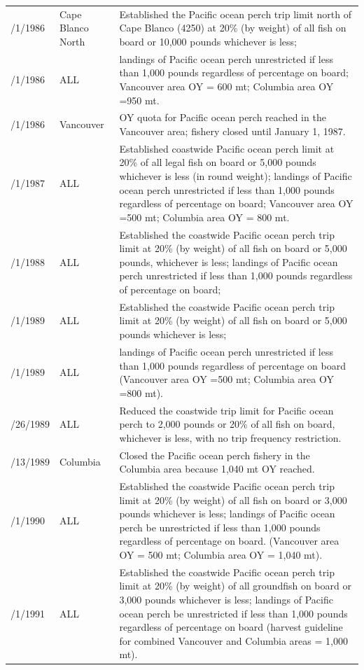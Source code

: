 \documentclass[12pt,]{article}
\begin{document}
\begin{table}[ht]
\begin{tabular}{>{\centering}p{.60in}>{\centering}p{1.0in}>{\raggedright}p{4.20in}}
  1/1/1986 &  Cape Blanco North  &  Established the Pacific ocean perch trip limit north of Cape Blanco (4250) at 20\% (by weight) of all fish on board or 10,000 pounds whichever is less;  \\ 
  1/1/1986 &  ALL  &  landings of Pacific ocean perch unrestricted if less than 1,000 pounds regardless of percentage on board; Vancouver area OY = 600 mt; Columbia area OY =950 mt.  \\ 
  12/1/1986 &  Vancouver  &  OY quota for Pacific ocean perch reached in the Vancouver area; fishery closed until January 1, 1987.  \\ 
  1/1/1987 &  ALL  &  Established coastwide Pacific ocean perch limit at 20\% of all legal fish on board or 5,000 pounds whichever is less (in round weight); landings of Pacific ocean perch unrestricted if less than 1,000 pounds regardless of percentage on board; Vancouver area OY =500 mt; Columbia area OY = 800 mt.  \\ 
  1/1/1988 &  ALL  &  Established the coastwide Pacific ocean perch trip limit at 20\% (by weight) of all fish on board or 5,000 pounds, whichever is less; landings of Pacific ocean perch unrestricted if less than 1,000 pounds regardless of percentage on board;  \\ 
  1/1/1989 &  ALL  &  Established the coastwide Pacific ocean perch trip limit at 20\% (by weight) of all fish on board or 5,000 pounds whichever is less;  \\ 
  1/1/1989 &  ALL  &  landings of Pacific ocean perch unrestricted if less than 1,000 pounds regardless of percentage on board (Vancouver area OY =500 mt; Columbia area OY =800 mt).  \\ 
  7/26/1989 &  ALL  &  Reduced the coastwide trip limit for Pacific ocean perch to 2,000 pounds or 20\% of all fish on board, whichever is less, with no trip frequency restriction.  \\ 
  12/13/1989 &  Columbia  &   Closed the Pacific ocean perch fishery in the Columbia area because 1,040 mt OY reached.  \\ 
  1/1/1990 &  ALL  &  Established the coastwide Pacific ocean perch trip limit at 20\% (by weight) of all fish on board or 3,000 pounds whichever is less; landings of Pacific ocean perch be unrestricted if less than 1,000 pounds regardless of percentage on board.  (Vancouver area OY = 500 mt; Columbia area OY = 1,040 mt). \\ 
  1/1/1991 &  ALL  &  Established the coastwide Pacific ocean perch trip limit at 20\% (by weight) of all groundfish on board or 3,000 pounds whichever is less; landings of Pacific ocean perch be unrestricted if less than 1,000 pounds regardless of percentage on board (harvest guideline for combined Vancouver and Columbia areas = 1,000 mt). \\ 

\end{tabular}
\end{table}
\end{document}
